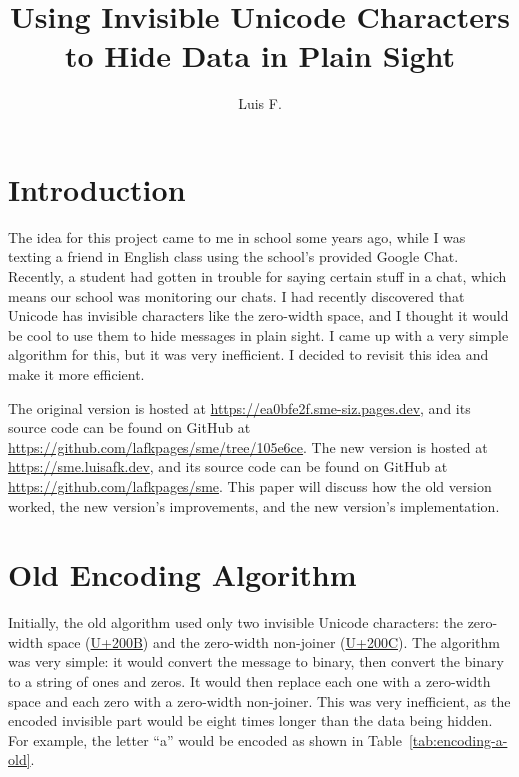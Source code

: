 \documentclass{article}
\title{Using Invisible Unicode Characters to Hide Data in Plain Sight}
\author{Luis F.}
\newcommand{\U}[1]{U+#1}
\begin{document}
\maketitle

\section{Introduction}

The idea for this project came to me in school some years ago, while I was texting a friend in English class using the school's provided Google Chat. Recently, a student had gotten in trouble for saying certain stuff in a chat, which means our school was monitoring our chats. I had recently discovered that Unicode has invisible characters like the zero-width space, and I thought it would be cool to use them to hide messages in plain sight. I came up with a very simple algorithm for this, but it was very inefficient. I decided to revisit this idea and make it more efficient.

The original version is hosted at \url{https://ea0bfe2f.sme-siz.pages.dev}, and its source code can be found on GitHub at \url{https://github.com/lafkpages/sme/tree/105e6ce}. The new version is hosted at \url{https://sme.luisafk.dev}, and its source code can be found on GitHub at \url{https://github.com/lafkpages/sme}. This paper will discuss how the old version worked, the new version's improvements, and the new version's implementation.

\section{Old Encoding Algorithm}

Initially, the old algorithm used only two invisible Unicode characters: the zero-width space (\href{https://compart.com/en/unicode/U+200B}{\U{200B}}) and the zero-width non-joiner (\href{https://compart.com/en/unicode/U+200C}{\U{200C}}). The algorithm was very simple: it would convert the message to binary, then convert the binary to a string of ones and zeros. It would then replace each one with a zero-width space and each zero with a zero-width non-joiner. This was very inefficient, as the encoded invisible part would be eight times longer than the data being hidden. For example, the letter ``a'' would be encoded as shown in Table~\ref{tab:encoding-a-old}.
\end{document}
